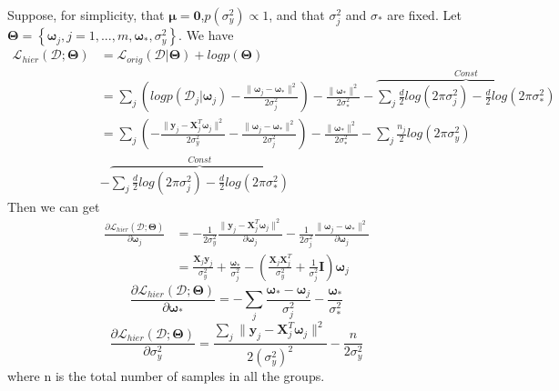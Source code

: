 \documentclass[paper=a4, fontsize=11pt]{scrartcl}
\numberwithin{equation}{section}		%
\numberwithin{figure}{section}			%
\numberwithin{table}{section}				%
\begin{document}
Suppose, for simplicity, that $\mathbf{\mu}=\textbf{0}$,$p(\sigma_{y}^2)\propto 1$, and that $\sigma_{j}^2$ and $\sigma_{\ast}$ are fixed. Let
$\mathbf{\Theta} = \left\{\mathbf{\omega}_j, j=1,...,m,\mathbf{\omega}_\ast,\sigma_{y}^2\right\}$. We have
\begin{equation}
\begin{aligned}
  \mathcal{L}_{hier}(\mathcal{D;\mathbf{\Theta}})& =
  \mathcal{L}_{orig}(\mathcal{D}|\mathbf{\Theta})+ \textit{logp}(\mathbf{\Theta})\\
  &=\sum_{j}\left(\textit{logp}(\mathcal{D}_{j}|\mathbf{\omega}_{j})-\frac{\parallel\mathbf{\omega}_{j}-\mathbf{\omega}_{\ast}\parallel^{2}}{2\sigma_{j}^2}\right)
  -\frac{\parallel\mathbf{\omega}_{\ast}\parallel^{2}}{2\sigma_{\ast}^2}
  - \overbrace{\sum_{j}\frac{d}{2}\textit{log}(2\pi\sigma_{j}^2)-\frac{d}{2}\textit{log}(2\pi\sigma_{\ast}^2)}^{\textit{Const}}\\
  &=\sum_{j}\left(-\frac{\parallel\mathbf{y}_{j}-\mathbf{X}^{T}_{j}\mathbf{\omega}_{j}\parallel^{2}}{2\sigma_{y}^2}-\frac{\parallel\mathbf{\omega}_{j}-\mathbf{\omega}_{\ast}\parallel^{2}}{2\sigma_{j}^2}\right)-
  \frac{\parallel\mathbf{\omega}_{\ast}\parallel^{2}}{2\sigma_{\ast}^2}-\sum_{j}\frac{n_{j}}{2}\textit{log}(2\pi\sigma_{y}^2)\\
  &- \overbrace{\sum_{j}\frac{d}{2}\textit{log}(2\pi\sigma_{j}^2)-\frac{d}{2}\textit{log}(2\pi\sigma_{\ast}^2)}^{\textit{Const}}
\end{aligned}
\end{equation}
Then we can get
\begin{equation}
\begin{aligned}
  \frac{\partial\mathcal{L}_{hier}(\mathcal{D};\mathbf{\Theta})}{\partial\mathbf{\omega}_j}
  &= -\frac{1}{2\sigma_{y}^2}\frac{\parallel\mathbf{y}_j-\mathbf{X}_{j}^{T}\mathbf{\omega}_j\parallel^2}{\partial\mathbf{\omega}_j}
  -\frac{1}{2\sigma_{j}^2}\frac{\parallel\mathbf{\omega}_j-\mathbf{\omega}_{\ast}\parallel^{2}}{\partial\mathbf{\omega}_j}\\
  &=\frac{\mathbf{X}_j\mathbf{y}_j}{\sigma_{y}^2}+\frac{\mathbf{\omega}_{\ast}}{\sigma^2_j}-
  \left(\frac{\mathbf{X}_j\mathbf{X}_j^{T}}{\sigma_{y}^2}+\frac{1}{\sigma_{j}^2}\mathbf{I}\right)\mathbf{\omega}_{j}
\end{aligned}
\end{equation}
\begin{equation}
  \frac{\partial\mathcal{L}_{hier}(\mathcal{D};\mathbf{\Theta})}{\partial\mathbf{\omega}_{\ast}}
  =-\sum_j\frac{\mathbf{\omega}_{\ast}-\mathbf{\omega}_j}{\sigma_{j}^2}-\frac{\mathbf{\omega}_{\ast}}{\sigma_{\ast}^2}
\end{equation}
\begin{equation}
  \frac{\partial\mathcal{L}_{hier}(\mathcal{D};\mathbf{\Theta})}{\partial\sigma_{y}^2}
  =\frac{\sum_j\parallel\mathbf{y}_j-\mathbf{X}_{j}^{T}\mathbf{\omega}_j\parallel^2}{2(\sigma_{y}^2)^2}-\frac{n}{2\sigma_{y}^2}
\end{equation}
where n is the total number of samples in all the groups.
\end{document}
